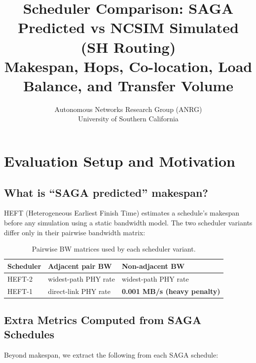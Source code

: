 \documentclass[11pt]{article}
\title{Scheduler Comparison: SAGA Predicted vs NCSIM Simulated (SH Routing)\\
{\large Makespan, Hops, Co-location, Load Balance, and Transfer Volume}}
\author{Autonomous Networks Research Group (ANRG)\\University of Southern California}
\date{}
\begin{document}
\maketitle
\tableofcontents
\newpage


\section{Evaluation Setup and Motivation}

\subsection{What is ``SAGA predicted'' makespan?}

HEFT (Heterogeneous Earliest Finish Time) estimates a schedule's makespan
before any simulation using a static bandwidth model.
The two scheduler variants differ only in their pairwise bandwidth matrix:

\begin{table}[H]
\centering
\begin{tabular}{lll}
\toprule
\textbf{Scheduler} & \textbf{Adjacent pair BW} & \textbf{Non-adjacent BW} \\
\midrule
HEFT-2 & widest-path PHY rate & widest-path PHY rate \\
HEFT-1 & direct-link PHY rate & \textbf{0.001 MB/s (heavy penalty)} \\
\bottomrule
\end{tabular}
\caption{Pairwise BW matrices used by each scheduler variant.}
\end{table}

\subsection{Extra Metrics Computed from SAGA Schedules}

Beyond makespan, we extract the following from each SAGA schedule:
\end{document}
